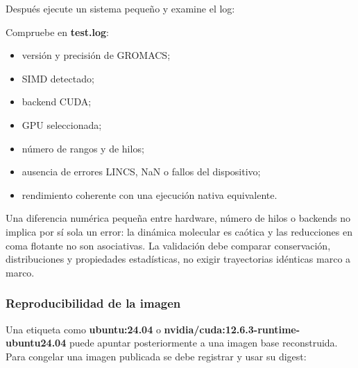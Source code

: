 \documentclass[
  spanish,
  11pt,
  a4paper]{article}
\newenvironment{Shaded}{\begin{snugshade}}{\end{snugshade}}
\newcommand{\AttributeTok}[1]{\textcolor[rgb]{0.13,0.29,0.53}{#1}}
\newcommand{\DataTypeTok}[1]{\textcolor[rgb]{0.13,0.29,0.53}{#1}}
\newcommand{\ExtensionTok}[1]{#1}
\newcommand{\FunctionTok}[1]{\textcolor[rgb]{0.13,0.29,0.53}{\textbf{#1}}}
\newcommand{\NormalTok}[1]{#1}
\newcommand{\StringTok}[1]{\textcolor[rgb]{0.31,0.60,0.02}{#1}}
\newcommand{\VariableTok}[1]{\textcolor[rgb]{0.00,0.00,0.00}{#1}}
\providecommand{\tightlist}{%
  \setlength{\itemsep}{0pt}\setlength{\parskip}{0pt}}
\begin{document}
Después ejecute un sistema pequeño y examine el log:

\begin{Shaded}
\end{Shaded}

Compruebe en \textbf{test.log}:

\begin{itemize}
\tightlist
\item
  versión y precisión de GROMACS;
\item
  SIMD detectado;
\item
  backend CUDA;
\item
  GPU seleccionada;
\item
  número de rangos y de hilos;
\item
  ausencia de errores LINCS, NaN o fallos del dispositivo;
\item
  rendimiento coherente con una ejecución nativa equivalente.
\end{itemize}

Una diferencia numérica pequeña entre hardware, número de hilos o
backends no implica por sí sola un error: la dinámica molecular es
caótica y las reducciones en coma flotante no son asociativas. La
validación debe comparar conservación, distribuciones y propiedades
estadísticas, no exigir trayectorias idénticas marco a marco.

\subsubsection{Reproducibilidad de la
imagen}\label{reproducibilidad-de-la-imagen}

Una etiqueta como \textbf{ubuntu:24.04} o
\textbf{nvidia/cuda:12.6.3-runtime-ubuntu24.04} puede apuntar
posteriormente a una imagen base reconstruida. Para congelar una imagen
publicada se debe registrar y usar su digest:
\end{document}

